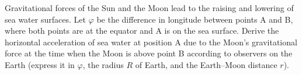 Gravitational forces of the Sun and the Moon lead to the raising and lowering
of sea water surfaces. Let $\varphi$ be the difference in longitude between
points A and B, where both points are at the equator and A is on the sea
surface. Derive the horizontal acceleration of sea water at position A due to
the Moon's gravitational force at the time when the Moon is above point B
according to observers on the Earth (express it in $\varphi$, the radius $R$ of
Earth, and the Earth--Moon distance $r$).
